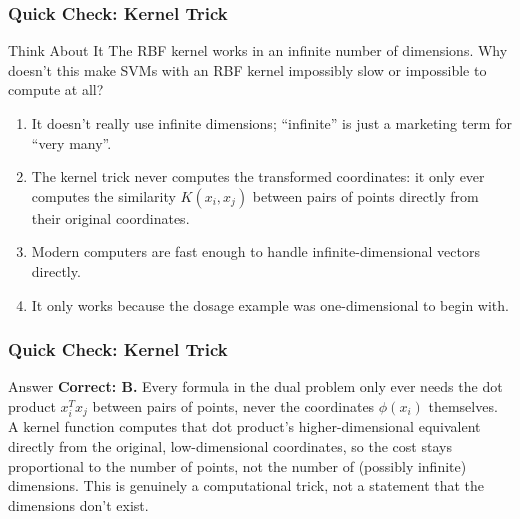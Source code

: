 \begin{frame}[fragile]\frametitle{Quick Check: Kernel Trick}
\begin{block}{Think About It}
The RBF kernel works in an infinite number of dimensions. Why doesn't this make SVMs with an
RBF kernel impossibly slow or impossible to compute at all?
\begin{enumerate}
\item[A.] It doesn't really use infinite dimensions; ``infinite'' is just a marketing term for
``very many''.
\item[B.] The kernel trick never computes the transformed coordinates: it only ever computes
the similarity $K(x_i,x_j)$ between pairs of points directly from their original coordinates.
\item[C.] Modern computers are fast enough to handle infinite-dimensional vectors directly.
\item[D.] It only works because the dosage example was one-dimensional to begin with.
\end{enumerate}
\end{block}
\end{frame}

\begin{frame}[fragile]\frametitle{Quick Check: Kernel Trick}
\begin{block}{Answer}
\textbf{Correct: B.} Every formula in the dual problem only ever needs the dot product
$x_i^Tx_j$ between pairs of points, never the coordinates $\phi(x_i)$ themselves. A kernel
function computes that dot product's higher-dimensional equivalent directly from the original,
low-dimensional coordinates, so the cost stays proportional to the number of points, not the
number of (possibly infinite) dimensions. This is genuinely a computational trick, not a
statement that the dimensions don't exist.
\end{block}
\end{frame}



